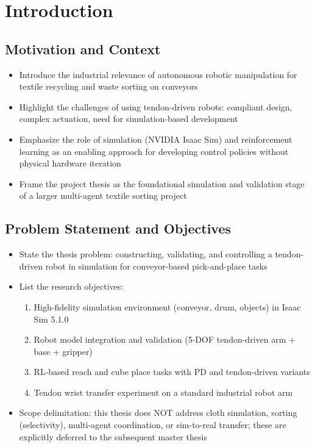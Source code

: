 
\chapter{Introduction}\label{ch:introduction}

\section{Motivation and Context}
\begin{itemize}
    \item Introduce the industrial relevance of autonomous robotic manipulation for textile recycling and waste sorting on conveyors
    \item Highlight the challenges of using tendon-driven robots: compliant design, complex actuation, need for simulation-based development
    \item Emphasize the role of simulation (NVIDIA Isaac Sim) and reinforcement learning as an enabling approach for developing control policies without physical hardware iteration
    \item Frame the project thesis as the foundational simulation and validation stage of a larger multi-agent textile sorting project
\end{itemize}

\section{Problem Statement and Objectives}
\begin{itemize}
    \item State the thesis problem: constructing, validating, and controlling a tendon-driven robot in simulation for conveyor-based pick-and-place tasks
    \item List the research objectives:
    \begin{enumerate}
        \item High-fidelity simulation environment (conveyor, drum, objects) in Isaac Sim 5.1.0
        \item Robot model integration and validation (5-DOF tendon-driven arm + base + gripper)
        \item RL-based reach and cube place tasks with PD and tendon-driven variants
        \item Tendon wrist transfer experiment on a standard industrial robot arm
    \end{enumerate}
    \item Scope delimitation: this thesis does NOT address cloth simulation, sorting (selectivity), multi-agent coordination, or sim-to-real transfer; these are explicitly deferred to the subsequent master thesis
\end{itemize}

